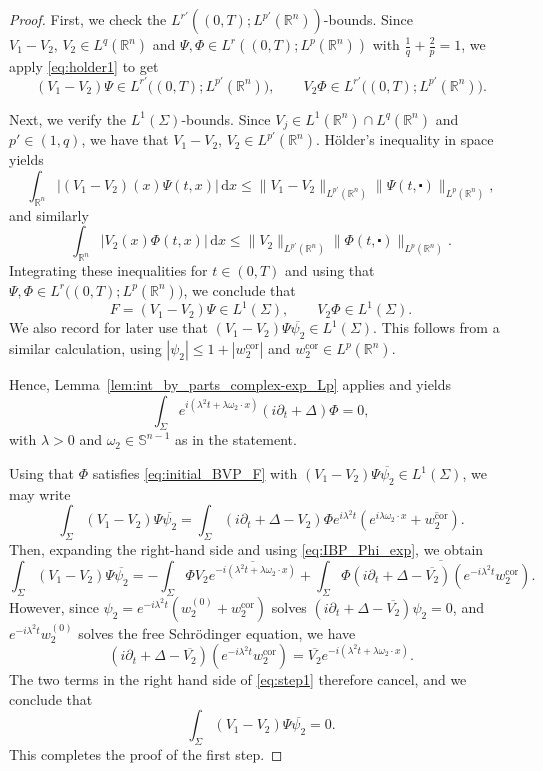 \documentclass[11pt,a4paper]{amsart}
\theoremstyle{remark}
\theoremstyle{definition}
\newcommand{\R}{\mathbb{R}}
\newcommand{\Sph}{\mathbb{S}}
\newcommand{\dd}{\mathrm{d}}
\def\ovl{\overline}
\def\cd{\centerdot}
\def\d{\partial}
\begin{document}
\begin{proof}
First, we check the $L^{r'}((0,T);L^{p'}(\R^n))$-bounds. Since $V_1-V_2,\,V_2\in L^q(\R^n)$ and $\Psi,\Phi\in L^{r}((0,T);L^p(\R^n))$ with $\frac1q+\frac2p=1$, we apply \eqref{eq:holder1} to get
\[
(V_1-V_2)\Psi \in L^{r'}\bigl((0,T);L^{p'}(\R^n)\bigr), \qquad V_2\Phi \in L^{r'}\bigl((0,T);L^{p'}(\R^n)\bigr).
\]

Next, we verify the $L^1(\Sigma)$-bounds. Since $V_j\in L^1(\R^n)\cap L^q(\R^n)$ and $p'\in (1,q)$, we have that $V_1-V_2,\,V_2\in L^{p'}(\R^n)$.  H\"older’s inequality in space yields
\[
\int_{\R^n} |(V_1-V_2)(x)\Psi(t,x)|\,\dd x \le \|V_1-V_2\|_{L^{p'}(\R^n)} \|\Psi(t,\cd)\|_{L^p(\R^n)},
\]
and similarly
\[
\int_{\R^n} |V_2(x)\Phi(t,x)|\,\dd x \le \|V_2\|_{L^{p'}(\R^n)} \|\Phi(t,\cd)\|_{L^p(\R^n)}.
\]
Integrating these inequalities for $t\in(0,T)$ and using that $\Psi,\Phi\in L^{r}\bigl((0,T);L^p(\R^n)\bigr)$, we conclude that
\[
F=(V_1-V_2)\Psi \in L^1(\Sigma), \qquad V_2\Phi \in L^1(\Sigma).
\]
We also record for later use that  $(V_1-V_2)\Psi \ovl{\psi_2}\in L^1(\Sigma)$. This follows from a similar calculation, using $|\psi_2|\le 1+|w_2^{\mathrm{cor}}|$ and $w_2^{\mathrm{cor}}\in L^p(\R^n)$.

Hence, Lemma~\ref{lem:int_by_parts_complex-exp_Lp} applies and yields
\begin{equation}\label{eq:IBP_Phi_exp}
\int_\Sigma e^{i(\lambda^2 t+\lambda\omega_2\cdot x)}(i\partial_t+\Delta)\Phi = 0,
\end{equation}
with $\lambda>0$ and $\omega_2\in\Sph^{n-1}$ as in the statement.

Using that $\Phi$ satisfies \eqref{eq:initial_BVP_F} with $(V_1-V_2)\Psi \ovl{\psi_2}\in L^1(\Sigma)$, we may write
\[
\int_\Sigma (V_1 - V_2)\Psi \ovl{\psi_2}= \int_\Sigma \left(i\d_t + \Delta - V_2\right)\Phi  e^{i\lambda^2 t}\left(e^{i\lambda\omega_2\cdot x}+\ovl{w^{\mathrm{cor}}_2}\right).
\]
Then, expanding the right-hand side and using \eqref{eq:IBP_Phi_exp}, we obtain
\begin{equation}\label{eq:step1}
\int_\Sigma (V_1 - V_2)\Psi \ovl{\psi_2}= - \int_\Sigma \Phi V_2  \ovl{e^{-i(\lambda^2 t+\lambda\omega_2\cdot x)}} + \int_\Sigma  \Phi \ovl{\left(i\d_t+\Delta-\ovl{V_2}\right)\left(e^{-i\lambda^2 t}w^{\mathrm{cor}}_2\right)}.
\end{equation}
However, since $\psi_2=e^{-i\lambda^2 t}(w^{(0)}_2+w^{\mathrm{cor}}_2)$ solves $(i\partial_t+\Delta-\ovl{ V_2})\psi_2=0$, and $e^{-i\lambda^2 t}w^{(0)}_2$ solves the free Schr\"odinger equation, we have
\[
\left(i\d_t+\Delta-\ovl{V_2}\right)\left(e^{-i\lambda^2 t}w^{\mathrm{cor}}_2\right) =\ovl{V_2} e^{-i(\lambda^2 t+\lambda\omega_2\cdot x)}.
\]
The two terms in the right hand side of \eqref{eq:step1} therefore cancel, and we conclude that
\[
\int_\Sigma (V_1 - V_2)\Psi \ovl{\psi_2} = 0.
\]
This completes the proof of the first step.


\end{proof}
\end{document}
